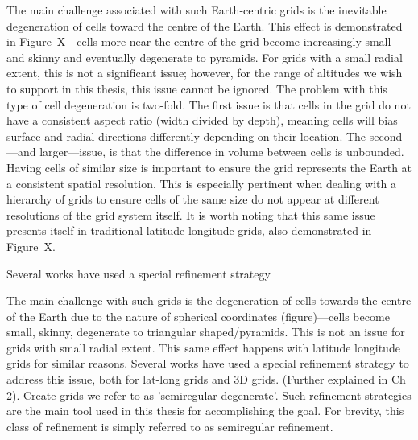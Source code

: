 The main challenge associated with such Earth-centric grids is the inevitable degeneration of cells toward the centre of the Earth.
This effect is demonstrated in Figure~X---cells more near the centre of the grid become increasingly small and skinny and eventually degenerate to pyramids.
For grids with a small radial extent, this is not a significant issue; however, for the range of altitudes we wish to support in this thesis, this issue cannot be ignored.
The problem with this type of cell degeneration is two-fold.
The first issue is that cells in the grid do not have a consistent aspect ratio (width divided by depth), meaning cells will bias surface and radial directions differently depending on their location.
The second---and larger---issue, is that the difference in volume between cells is unbounded.
Having cells of similar size is important to ensure the grid represents the Earth at a consistent spatial resolution.
This is especially pertinent when dealing with a hierarchy of grids to ensure cells of the same size do not appear at different resolutions of the grid system itself.
It is worth noting that this same issue presents itself in traditional latitude-longitude grids, also demonstrated in Figure~X. 

Several works have used a special refinement strategy 



The main challenge with such grids is the degeneration of cells towards the centre of the Earth due to the nature of spherical coordinates (figure)---cells become small, skinny, degenerate to triangular shaped/pyramids. This is not an issue for grids with small radial extent. This same effect happens with latitude longitude grids for similar reasons. Several works have used a special refinement strategy to address this issue, both for lat-long grids and 3D grids. (Further explained in Ch 2). Create grids we refer to as 'semiregular degenerate'. Such refinement strategies are the main tool used in this thesis for accomplishing the goal. For brevity, this class of refinement is simply referred to as semiregular refinement.  

